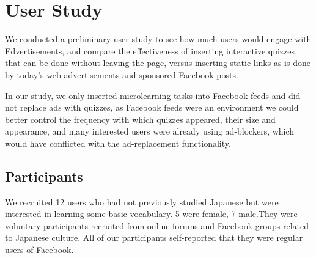 \documentclass{sigchi}
\begin{document}


\section{User Study}

We conducted a preliminary user study to see how much users would engage with Edvertisements, and compare the effectiveness of inserting interactive quizzes that can be done without leaving the page, versus inserting static links as is done by today's web advertisements and sponsored Facebook posts. %


In our study, we only inserted microlearning tasks into Facebook feeds and did not replace ads with quizzes, as Facebook feeds were an environment we could better control the frequency with which quizzes appeared, their size and appearance, and many interested users were already using ad-blockers, which would have conflicted with the ad-replacement functionality.

\subsection{Participants}

We recruited 12 users who had not previously studied Japanese but were interested in learning some basic vocabulary.  5 were female, 7 male.They were voluntary participants recruited from online forums and Facebook groups related to Japanese culture. All of our participants self-reported that they were regular users of Facebook. %

\end{document}
